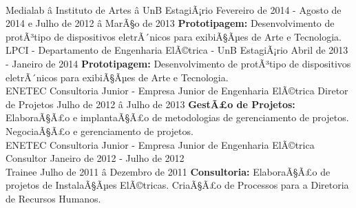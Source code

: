 \documentclass[a4paper]{twentysecondcv} %
\begin{document}
\begin{twenty}
{            \color{pblue}{\hspace{8pt}-\hspace{4pt}} 
        }
        \\
    \twentyitem
    	{Medialab â Instituto de Artes â UnB}
		{EstagiÃ¡rio}
		{Fevereiro de 2014 - Agosto de 2014 e Julho de 2012 â MarÃ§o de 2013}
        {
            \color{pblue}{\hspace{8pt}-\hspace{4pt}} \color{black}\textbf{Prototipagem: }Desenvolvimento de protÃ³tipo de dispositivos eletrÃ´nicos para exibiÃ§Ãµes de Arte e Tecnologia.
        }
        \\
    \twentyitem
    {LPCI - Departamento de Engenharia ElÃ©trica - UnB}
    {EstagiÃ¡rio}
    {Abril de 2013 - Janeiro de 2014}
    {
        \color{pblue}{\hspace{8pt}-\hspace{4pt}} \color{black}\textbf{Prototipagem: }Desenvolvimento de protÃ³tipo de dispositivos eletrÃ´nicos para exibiÃ§Ãµes de Arte e Tecnologia.
    }
    \\
    \twentyitem
    {ENETEC Consultoria Junior - Empresa Junior de Engenharia ElÃ©trica}
    {Diretor de Projetos}
    {Julho de 2012 â Julho de 2013}
    {\color{pblue}{\hspace{8pt}-\hspace{4pt}} \color{black}\textbf{GestÃ£o de Projetos: }ElaboraÃ§Ã£o e implantaÃ§Ã£o de metodologias de gerenciamento de projetos. NegociaÃ§Ã£o e gerenciamento de projetos.}
    \\
    \twentyitem
    {ENETEC Consultoria Junior - Empresa Junior de Engenharia ElÃ©trica}
    {Consultor \hfill Janeiro de 2012 - Julho de 2012\\}
    {Trainee  \hfill Julho de 2011 â Dezembro de 2011}
    {\color{pblue}{\hspace{8pt}-\hspace{4pt}} \color{black}\textbf{Consultoria: }ElaboraÃ§Ã£o de projetos de InstalaÃ§Ãµes ElÃ©tricas. CriaÃ§Ã£o de Processos para a Diretoria de Recursos Humanos.}
\end{twenty}

\end{document}
